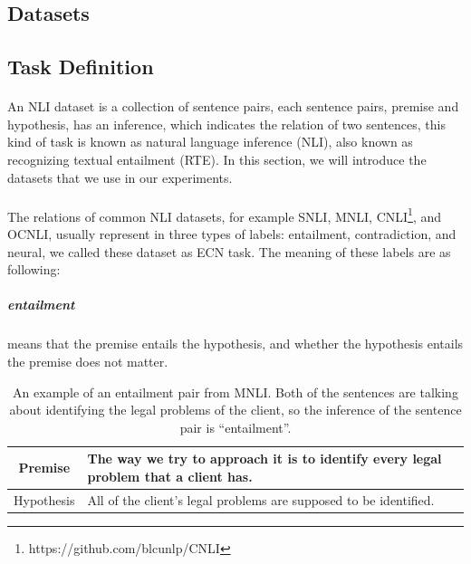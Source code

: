 \documentclass[12pt]{article}
\begin{document}
\begin{CJK*}{UTF8}{bkai}
\begin{spacing}{1.77}
\section{Datasets} \label{section:datasets}

\subsection{Task Definition}
\paragraph{}
An NLI dataset is a collection of sentence pairs, each sentence pairs, premise and hypothesis, has an inference, which indicates the relation of two sentences, this kind of task is known as natural language inference (NLI), also known as recognizing textual entailment (RTE). In this section, we will introduce the datasets that we use in our experiments.

\paragraph{}
The relations of common NLI datasets, for example SNLI\cite{snli:emnlp2015}, MNLI\cite{N18-1101}, CNLI\footnote{https://github.com/blcunlp/CNLI}, and OCNLI\cite{ocnli}, usually represent in three types of labels: entailment, contradiction, and neural, we called these dataset as ECN task. The meaning of these labels are as following:

\subparagraph{entailment} means that the premise entails the hypothesis, and whether the hypothesis entails the premise does not matter.
\begin{table}[ht!]
  \centering
  \begin{tabular}{|c|l|}
    \hline
    Premise & The way we try to approach it is to identify every legal problem that a client has. \\ \hline
    Hypothesis & All of the client's legal problems are supposed to be identified. \\ \hline
  \end{tabular}
  \caption[An example of an entailment pair from MNLI]{An example of an entailment pair from MNLI. Both of the sentences are talking about identifying the legal problems of the client, so the inference of the sentence pair is ``entailment''.}
\end{table}


\end{spacing}
\end{CJK*}
\end{document}
